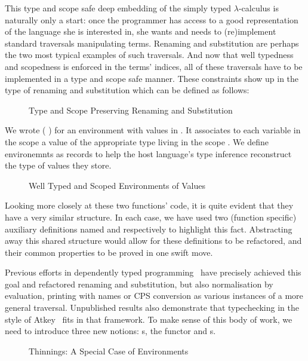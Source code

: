 This type and scope safe deep embedding of the simply typed $\lambda$-calculus is
naturally only a start: once the programmer has access to a good
representation of the language she is interested in, she wants and
needs to (re)implement standard traversals manipulating terms.
Renaming and substitution are perhaps the two most typical examples
of such traversals. And now that well typedness and scopedness is enforced in
the terms' indices, all of these traversals have to be implemented
in a type and scope safe manner. These constraints show up in the type of
renaming and substitution which can be defined as follows:

\begin{figure}[h]
\begin{minipage}{0.45\textwidth}
\end{minipage}\hspace{2em}
\begin{minipage}{0.45\textwidth}
\end{minipage}
\caption{Type and Scope Preserving Renaming and Substitution}
\end{figure}

We wrote ( )   for an environment with values
in . It associates to each variable in the scope  a value of
the appropriate type living in the scope . We define environemnts
as records to help the host language's type inference reconstruct the type
of values they store.

\begin{figure}[h]
\caption{Well Typed and Scoped Environments of Values}
\end{figure}

Looking more closely at these two functions' code, it is quite evident
that they have a very similar structure. In each case, we have used
two (function specific) auxiliary definitions named  and 
respectively to highlight this fact. Abstracting away this shared structure
would allow for these definitions to be refactored, and their common
properties to be proved in one swift move.

Previous efforts in dependently typed
programming~\cite{benton2012strongly,allais2017type}
have precisely achieved this goal and refactored renaming and substitution,
but also normalisation by evaluation, printing with names or CPS conversion
as various instances of a more general traversal. Unpublished results also
demonstrate that typechecking in the style of Atkey~\citeyear{atkey2015algebraic}
fits in that framework. To make sense of this body of work, we
need to introduce three new notions: s, the  functor and
s.
\label{def:thinning}
\begin{figure}[h]
\caption{Thinnings: A Special Case of Environments}
\end{figure}

